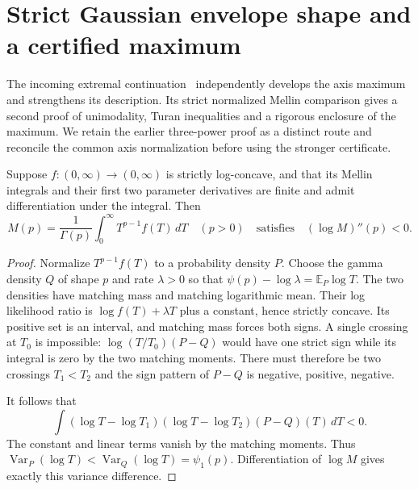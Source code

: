 \section{Strict Gaussian envelope shape and a certified maximum}
\label{envref:sec:main}
The incoming extremal continuation~\cite{envref:report} independently
develops the axis maximum and strengthens its description. Its strict
normalized Mellin comparison gives a second proof of unimodality, Turan
inequalities and a rigorous enclosure of the maximum. We retain the
earlier three-power proof as a distinct route and reconcile the common
axis normalization before using the stronger certificate.

\begin{lemma}\label{envref:lem:Mellin}
Suppose $f:(0,\infty)\to(0,\infty)$ is strictly log-concave, and that
its Mellin integrals and their first two parameter derivatives are finite
and admit differentiation under the integral. Then
\[
 M(p)=\frac1{\Gamma(p)}\int_0^\infty T^{p-1}f(T)\,dT\quad(p>0)
 \quad\text{satisfies}\quad (\log M)''(p)<0.
\]
\end{lemma}
\begin{proof}
Normalize $T^{p-1}f(T)$ to a probability density $P$. Choose the gamma
density $Q$ of shape $p$ and rate $\lambda>0$ so that
$\psi(p)-\log\lambda=\mathbb E_P\log T$.
The two densities have matching mass and matching logarithmic mean.
Their log likelihood ratio is $\log f(T)+\lambda T$ plus a constant,
hence strictly concave. Its positive set is an interval, and matching
mass forces both signs. A single crossing at $T_0$ is impossible:
$\log(T/T_0)(P-Q)$ would have one strict sign while its integral is
zero by the two matching moments. There must therefore be two crossings
$T_1<T_2$ and the sign pattern of $P-Q$ is negative, positive, negative.

It follows that
\[
 \int(\log T-\log T_1)(\log T-\log T_2)(P-Q)(T)\,dT<0.
\]
The constant and linear terms vanish by the matching moments. Thus
$\operatorname{Var}_P(\log T)<\operatorname{Var}_Q(\log T)=\psi_1(p)$.
Differentiation of $\log M$ gives exactly this variance difference.
\end{proof}

